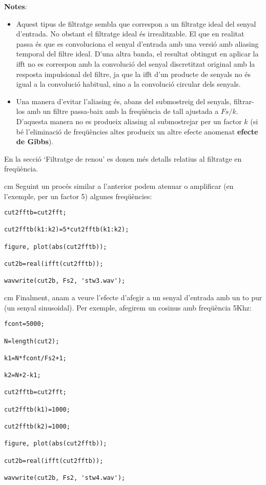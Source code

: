 \documentclass{article}
\begin{document}
\textbf{Notes}:
\begin{itemize}
\item Aquest tipus de filtratge sembla que correspon a un filtratge ideal  del senyal d'entrada. No obstant
el filtratge ideal és irrealitzable. El que en realitat passa és que es convoluciona el senyal d'entrada amb una versió amb
aliasing temporal del filtre ideal. D'una altra banda, el resultat obtingut en aplicar la ifft no es correspon amb la convolució
del senyal discretitzat original amb la resposta impulsional del filtre, ja que la ifft d'un producte de senyals no és igual
a la convolució habitual, sino a la convolució circular dels senyals.
\item Una manera d'evitar l'aliasing és, abans del submostreig del senyals, filtrar-los amb un filtre passa-baix amb la
freqüència de tall ajustada a $Fs/k$. D'aquesta manera no es produeix aliasing al submostrejar per un factor $k$
(si bé l'eliminació de freqüències altes produeix un altre efecte anomenat \textbf{efecte de Gibbs}).
\end{itemize}

En la secció `Filtratge de renou' es donen més detalls relatius al filtratge en freqüència.


 cm
Seguint un procés similar a l'anterior podem atenuar o amplificar (en l'exemple, per un factor 5) algunes freqüències:
\begin{verbatim}
cut2fftb=cut2fft;

cut2fftb(k1:k2)=5*cut2fftb(k1:k2);

figure, plot(abs(cut2fftb));

cut2b=real(ifft(cut2fftb));

wavwrite(cut2b, Fs2, 'stw3.wav');
\end{verbatim}

 cm
Finalment, anam a veure l'efecte d'afegir a un senyal d'entrada amb un to pur (un senyal sinusoidal).
Per exemple, afegirem un cosinus amb freqüència 5Khz:

\begin{verbatim}
fcont=5000;

N=length(cut2);

k1=N*fcont/Fs2+1;

k2=N+2-k1;

cut2fftb=cut2fft;

cut2fftb(k1)=1000;

cut2fftb(k2)=1000;

figure, plot(abs(cut2fftb));

cut2b=real(ifft(cut2fftb));

wavwrite(cut2b, Fs2, 'stw4.wav');

\end{verbatim}
\end{document}
